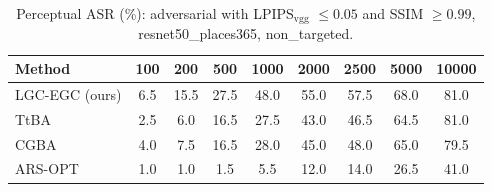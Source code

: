\begin{table}[t]
\centering\footnotesize
\caption{Perceptual ASR (\%): adversarial with LPIPS$_{\mathrm{vgg}}$ $\le 0.05$ and SSIM $\ge 0.99$, resnet50\_places365, non\_targeted.}
\begin{tabular}{lcccccccc}
\toprule
Method & 100 & 200 & 500 & 1000 & 2000 & 2500 & 5000 & 10000 \\
\midrule
LGC-EGC (ours) & 6.5 & 15.5 & 27.5 & 48.0 & 55.0 & 57.5 & 68.0 & 81.0 \\
TtBA & 2.5 & 6.0 & 16.5 & 27.5 & 43.0 & 46.5 & 64.5 & 81.0 \\
CGBA & 4.0 & 7.5 & 16.5 & 28.0 & 45.0 & 48.0 & 65.0 & 79.5 \\
ARS-OPT & 1.0 & 1.0 & 1.5 & 5.5 & 12.0 & 14.0 & 26.5 & 41.0 \\
\bottomrule
\end{tabular}
\end{table}
